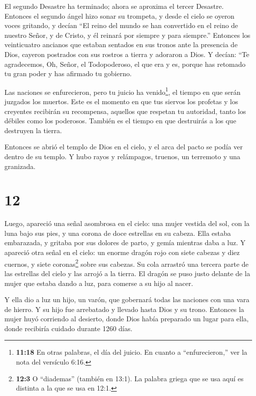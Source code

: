  El segundo Desastre ha terminado; ahora se aproxima el
tercer Desastre.  Entonces el segundo ángel hizo sonar su
trompeta, y desde el cielo se oyeron voces gritando, y decían ``El reino
del mundo se han convertido en el reino de nuestro Señor, y de Cristo, y
él reinará por siempre y para siempre.''  Entonces los
veinticuatro ancianos que estaban sentados en sus tronos ante la
presencia de Dios, cayeron postrados con sus rostros a tierra y adoraron
a Dios.  Y decían: ``Te agradecemos, Oh, Señor, el
Todopoderoso, el que era y es, porque has retomado tu gran poder y has
afirmado tu gobierno.

 Las naciones se enfurecieron, pero tu juicio ha
venido\footnote{\textbf{11:18} En otras palabras, el día del juicio. En
  cuanto a ``enfurecieron,'' ver la nota del versículo 6:16.}, el tiempo
en que serán juzgados los muertos. Este es el momento en que tus siervos
los profetas y los creyentes recibirán su recompensa, aquellos que
respetan tu autoridad, tanto los débiles como los poderosos. También es
el tiempo en que destruirás a los que destruyen la tierra.

 Entonces se abrió el templo de Dios en el cielo, y el arca
del pacto se podía ver dentro de su templo. Y hubo rayos y relámpagos,
truenos, un terremoto y una granizada.

\hypertarget{section-11}{%
\section{12}\label{section-11}}

 Luego, apareció una señal asombrosa en el cielo: una mujer
vestida del sol, con la luna bajo sus pies, y una corona de doce
estrellas en su cabeza.  Ella estaba embarazada, y gritaba
por sus dolores de parto, y gemía mientras daba a luz.  Y
apareció otra señal en el cielo: un enorme dragón rojo con siete cabezas
y diez cuernos, y siete coronas\footnote{\textbf{12:3} O ``diademas''
  (también en 13:1). La palabra griega que se usa aquí es distinta a la
  que se usa en 12:1.} sobre sus cabezas.  Su cola arrastró
una tercera parte de las estrellas del cielo y las arrojó a la tierra.
El dragón se puso justo delante de la mujer que estaba dando a luz, para
comerse a su hijo al nacer.

 Y ella dio a luz un hijo, un varón, que gobernará todas las
naciones con una vara de hierro. Y su hijo fue arrebatado y llevado
hasta Dios y su trono.  Entonces la mujer huyó corriendo al
desierto, donde Dios había preparado un lugar para ella, donde recibiría
cuidado durante 1260 días.

